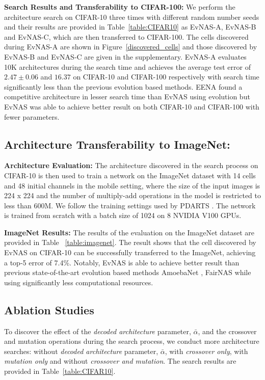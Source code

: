 \documentclass[final]{cvpr}
\begin{document}
\textbf{Search Results and Transferability to CIFAR-100:} We perform the architecture search on
CIFAR-10 three times with different random number seeds and their
results are provided in Table~\ref{table:CIFAR10} as EvNAS-A, EvNAS-B and EvNAS-C, which are then
transferred to CIFAR-100. The cells discovered during EvNAS-A are shown in
Figure~\ref{discovered_cells} and those discovered by EvNAS-B and EvNAS-C are given in the
supplementary. EvNAS-A evaluates 10K architectures during the search time and achieves the
average test error of $2.47\pm0.06$ and $16.37$ on CIFAR-10 and CIFAR-100 respectively with
search time significantly less than the previous evolution based methods.
EENA \cite{zhu2019eena} found a competitive architecture in lesser search time than EvNAS using
evolution but EvNAS was able to achieve better result on both CIFAR-10 and CIFAR-100 with fewer
parameters. 

\subsection{Architecture Transferability to ImageNet:}
\textbf{Architecture Evaluation:} The architecture discovered in the search process on CIFAR-10 is
then used to train a network on the ImageNet dataset \cite{imagenet_cvpr09} with 14 cells and 48
initial channels in the mobile setting, where the size of the input images is 224 x 224 and the
number of multiply-add operations in the model is restricted to less than 600M. We follow the
training settings used by PDARTS \cite{chen2019progressive}. The network is trained from scratch with a batch size of 1024 on 8 NVIDIA V100 GPUs. 


\textbf{ImageNet Results:}  The results of the evaluation on the ImageNet dataset are provided in
Table ~\ref{table:imagenet}. The result shows that the cell discovered by EvNAS on CIFAR-10 can be
successfully transferred to the ImageNet, achieving a top-5 error of 7.4\%. Notably, EvNAS is able
to achieve better result than previous state-of-the-art evolution based methods AmoebaNet
\cite{real2019regularized}, FairNAS \cite{chu2019fairnas} while using significantly less computational resources.

\subsection{Ablation Studies} \label{ablation}
To discover the effect of the \textit{decoded architecture} parameter, $\bar{\alpha}$, and the
crossover and mutation operations during the search process, we conduct more architecture
searches: without \textit{decoded architecture} parameter, $\bar{\alpha}$, with \textit{crossover 
only}, with \textit{mutation only} and without \textit{crossover and mutation}. The search results
are provided in Table~\ref{table:CIFAR10}.
\end{document}
